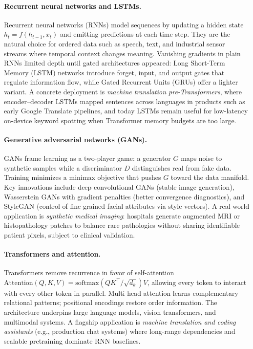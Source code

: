 \documentclass[11pt,a4paper]{article}
\begin{document}
\paragraph{Recurrent neural networks and LSTMs.}
Recurrent neural networks (RNNs) model sequences by updating a hidden state $h_t = f(h_{t-1}, x_t)$ and emitting predictions at each time step.
They are the natural choice for ordered data such as speech, text, and industrial sensor streams where temporal context changes meaning.
Vanishing gradients in plain RNNs limited depth until gated architectures appeared: Long Short-Term Memory (LSTM) networks introduce forget, input, and output gates that regulate information flow, while Gated Recurrent Units (GRUs) offer a lighter variant.
A concrete deployment is \emph{machine translation pre-Transformers}, where encoder--decoder LSTMs mapped sentences across languages in products such as early Google Translate pipelines, and today LSTMs remain useful for low-latency on-device keyword spotting when Transformer memory budgets are too large.

\paragraph{Generative adversarial networks (GANs).}
GANs frame learning as a two-player game: a generator $G$ maps noise to synthetic samples while a discriminator $D$ distinguishes real from fake data.
Training minimizes a minimax objective that pushes $G$ toward the data manifold.
Key innovations include deep convolutional GANs (stable image generation), Wasserstein GANs with gradient penalties (better convergence diagnostics), and StyleGAN (control of fine-grained facial attributes via style vectors).
A real-world application is \emph{synthetic medical imaging}: hospitals generate augmented MRI or histopathology patches to balance rare pathologies without sharing identifiable patient pixels, subject to clinical validation.

\paragraph{Transformers and attention.}
Transformers remove recurrence in favor of self-attention $\mathrm{Attention}(Q,K,V)=\mathrm{softmax}(QK^\top/\sqrt{d_k})V$, allowing every token to interact with every other token in parallel.
Multi-head attention learns complementary relational patterns; positional encodings restore order information.
The architecture underpins large language models, vision transformers, and multimodal systems.
A flagship application is \emph{machine translation and coding assistants} (e.g., production chat systems) where long-range dependencies and scalable pretraining dominate RNN baselines.
\end{document}
